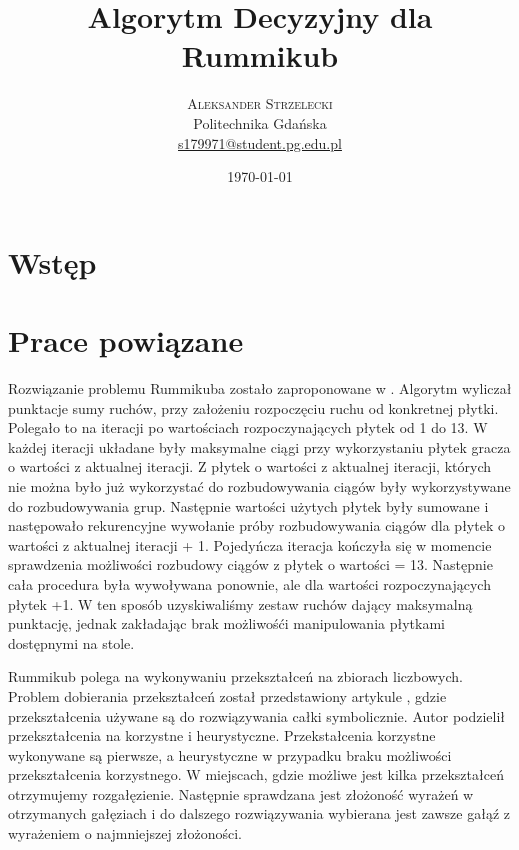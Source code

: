 \documentclass[twoside,twocolumn]{article}
\title{Algorytm Decyzyjny dla Rummikub} %
\author{%
\textsc{Aleksander Strzelecki}\\[1ex] %
\normalsize Politechnika Gdańska \\ %
\normalsize \href{mailto:s179971@student.pg.edu.pl}{s179971@student.pg.edu.pl} %
}
\date{\today} %
\begin{document}
\maketitle


\section{Wstęp}




\section{Prace powiązane}

Rozwiązanie problemu Rummikuba zostało zaproponowane w \cite{Rijn:2016}. Algorytm wyliczał punktacje sumy ruchów, przy założeniu 
rozpoczęciu ruchu od konkretnej płytki. Polegało to na iteracji po wartościach rozpoczynających płytek od 1 do 13. W każdej iteracji układane były maksymalne 
ciągi przy wykorzystaniu płytek gracza o wartości z aktualnej iteracji. Z płytek o wartości z aktualnej iteracji, których nie można było już 
wykorzystać do rozbudowywania ciągów były wykorzystywane do rozbudowywania grup. Następnie wartości użytych płytek były sumowane i następowało 
rekurencyjne wywołanie próby rozbudowywania ciągów dla płytek o wartości z aktualnej iteracji + 1. Pojedyńcza iteracja kończyła się w momencie 
sprawdzenia możliwości rozbudowy ciągów z płytek o 
wartości = 13. Następnie cała procedura była wywoływana ponownie, ale dla wartości rozpoczynających płytek +1. W ten sposób uzyskiwaliśmy zestaw ruchów dający maksymalną punktację, jednak zakładając brak możliwośći manipulowania 
płytkami dostępnymi na stole.

Rummikub polega na wykonywaniu przekształceń na zbiorach liczbowych. Problem dobierania przekształceń został 
przedstawiony artykule \cite{Slagle:1963}, gdzie przekształcenia używane są do rozwiązywania całki symbolicznie.
Autor podzielił przekształcenia na korzystne i heurystyczne. Przekstałcenia korzystne wykonywane są pierwsze, a
heurystyczne w przypadku braku możliwości przekształcenia korzystnego. W miejscach, gdzie możliwe jest kilka 
przekształceń otrzymujemy rozgałęzienie. Następnie sprawdzana jest złożoność wyrażeń w otrzymanych gałęziach i 
do dalszego rozwiązywania wybierana jest zawsze gałąź z wyrażeniem o najmniejszej złożoności.
\end{document}

